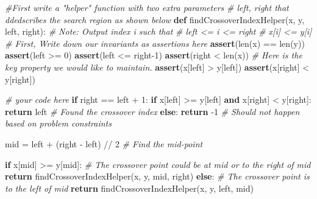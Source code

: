 \documentclass[
]{article}
\newenvironment{Shaded}{}{}
\newcommand{\BuiltInTok}[1]{\textcolor[rgb]{0.00,0.50,0.00}{#1}}
\newcommand{\CommentTok}[1]{\textcolor[rgb]{0.38,0.63,0.69}{\textit{#1}}}
\newcommand{\ControlFlowTok}[1]{\textcolor[rgb]{0.00,0.44,0.13}{\textbf{#1}}}
\newcommand{\DecValTok}[1]{\textcolor[rgb]{0.25,0.63,0.44}{#1}}
\newcommand{\KeywordTok}[1]{\textcolor[rgb]{0.00,0.44,0.13}{\textbf{#1}}}
\newcommand{\NormalTok}[1]{#1}
\newcommand{\OperatorTok}[1]{\textcolor[rgb]{0.40,0.40,0.40}{#1}}
\begin{document}
\begin{Shaded}
\begin{Highlighting}[]
\CommentTok{\#First write a "helper" function with two extra parameters}
\CommentTok{\# left, right that ddedscribes the search region as shown below}
\KeywordTok{def}\NormalTok{ findCrossoverIndexHelper(x, y, left, right):}
    \CommentTok{\# Note: Output index i such that }
    \CommentTok{\#         left \textless{}= i \textless{}= right}
    \CommentTok{\#         x[i] \textless{}= y[i]}
    \CommentTok{\# First, Write down our invariants as assertions here}
    \ControlFlowTok{assert}\NormalTok{(}\BuiltInTok{len}\NormalTok{(x) }\OperatorTok{==} \BuiltInTok{len}\NormalTok{(y))}
    \ControlFlowTok{assert}\NormalTok{(left }\OperatorTok{\textgreater{}=} \DecValTok{0}\NormalTok{)}
    \ControlFlowTok{assert}\NormalTok{(left }\OperatorTok{\textless{}=}\NormalTok{ right}\OperatorTok{{-}}\DecValTok{1}\NormalTok{)}
    \ControlFlowTok{assert}\NormalTok{(right }\OperatorTok{\textless{}} \BuiltInTok{len}\NormalTok{(x))}
    \CommentTok{\# Here is the key property we would like to maintain.}
    \ControlFlowTok{assert}\NormalTok{(x[left] }\OperatorTok{\textgreater{}}\NormalTok{ y[left])}
    \ControlFlowTok{assert}\NormalTok{(x[right] }\OperatorTok{\textless{}}\NormalTok{ y[right])}
    
    \CommentTok{\# your code here}
    \ControlFlowTok{if}\NormalTok{ right }\OperatorTok{==}\NormalTok{ left }\OperatorTok{+} \DecValTok{1}\NormalTok{:}
        \ControlFlowTok{if}\NormalTok{ x[left] }\OperatorTok{\textgreater{}=}\NormalTok{ y[left] }\KeywordTok{and}\NormalTok{ x[right] }\OperatorTok{\textless{}}\NormalTok{ y[right]:}
            \ControlFlowTok{return}\NormalTok{ left  }\CommentTok{\# Found the crossover index}
        \ControlFlowTok{else}\NormalTok{:}
            \ControlFlowTok{return} \OperatorTok{{-}}\DecValTok{1}  \CommentTok{\# Should not happen based on problem constraints}
    
\NormalTok{    mid }\OperatorTok{=}\NormalTok{ left }\OperatorTok{+}\NormalTok{ (right }\OperatorTok{{-}}\NormalTok{ left) }\OperatorTok{//} \DecValTok{2}  \CommentTok{\# Find the mid{-}point}
    
    \ControlFlowTok{if}\NormalTok{ x[mid] }\OperatorTok{\textgreater{}=}\NormalTok{ y[mid]:}
        \CommentTok{\# The crossover point could be at mid or to the right of mid}
        \ControlFlowTok{return}\NormalTok{ findCrossoverIndexHelper(x, y, mid, right)}
    \ControlFlowTok{else}\NormalTok{:}
        \CommentTok{\# The crossover point is to the left of mid}
        \ControlFlowTok{return}\NormalTok{ findCrossoverIndexHelper(x, y, left, mid)}
        
\end{Highlighting}
\end{Shaded}
\end{document}
